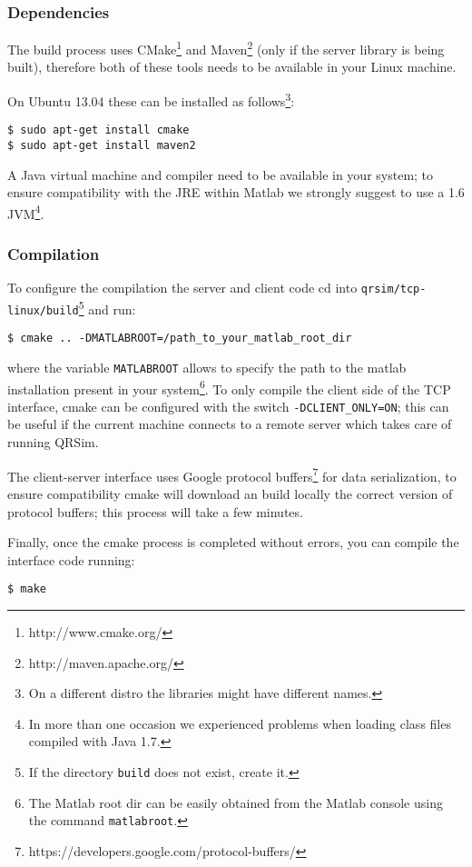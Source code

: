 \documentclass[a4paper,11pt]{report}
\begin{document}
\subsubsection{Dependencies} 
The build process uses CMake\footnote{http://www.cmake.org/} and Maven\footnote{http://maven.apache.org/} (only if the server library is being built), therefore both of these tools needs to be available in your Linux machine.

On Ubuntu 13.04 these can be installed as follows\footnote{On a different distro the libraries might have different names.}:
\begin{verbatim}
$ sudo apt-get install cmake
$ sudo apt-get install maven2
\end{verbatim}

A Java virtual machine and compiler need to be available in your system; to ensure compatibility with the JRE within Matlab we strongly suggest to use a 1.6 JVM\footnote{In more than one occasion we experienced problems when loading class files compiled with Java 1.7.}.

\subsubsection{Compilation} \label{comp}
To configure the compilation the server and client code cd into \texttt{qrsim/tcp-linux/build}\footnote{If the directory \texttt{build} does not exist, create it.} and run:
\begin{verbatim}
$ cmake .. -DMATLABROOT=/path_to_your_matlab_root_dir
\end{verbatim}
where the variable \texttt{MATLABROOT} allows to specify the path to the matlab installation present in your system\footnote{The Matlab root dir can be easily obtained from the Matlab console using the command \texttt{matlabroot}.}.
To only compile the client side of the TCP interface, cmake can be configured with the switch \texttt{-DCLIENT\_ONLY=ON}; this can be useful if the current machine connects to a remote server which takes care of running QRSim.

The client-server interface uses Google protocol buffers\footnote{https://developers.google.com/protocol-buffers/} for data serialization, to ensure compatibility cmake will download an build locally the correct version of protocol buffers; this process will take a few minutes.

Finally, once the cmake process is completed without errors, you can compile the interface code running: 
\begin{verbatim}
$ make
\end{verbatim}
\end{document}

